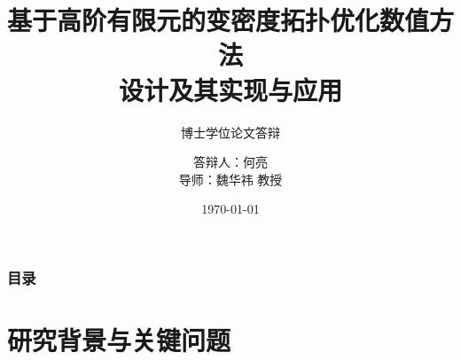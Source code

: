 \documentclass[notheorems]{beamer}
\begin{document}
	
	\title[基于高阶有限元的拓扑优化]{基于高阶有限元的变密度拓扑优化数值方法\\设计及其实现与应用}
	\subtitle{\fontsize{13pt}{15.6pt}\selectfont 博士学位论文答辩}
	
	\author[何亮]{答辩人：何亮 \\
		\vspace{5pt}
		导师：{魏华祎} 教授}
	

	\date{\today}
	
	\frame[plain]{\titlepage}
	
	
	\begin{frame}
		\frametitle{目录}
		\tableofcontents
	\end{frame}
	
	
	\section{研究背景与关键问题}
	
	
\end{document}
